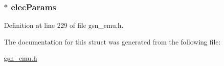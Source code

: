 \hypertarget{a00064_a76b36b28c0c66c5998cc5981154df9ed}{
\subsubsection[{elecParams}]{$\ast$ {\bf elecParams}}}
\label{a00064_a76b36b28c0c66c5998cc5981154df9ed}


Definition at line 229 of file gsn\_\-emu.h.



The documentation for this struct was generated from the following file:\begin{DoxyCompactItemize}
\item 
\hyperlink{a00489}{gsn\_\-emu.h}\end{DoxyCompactItemize}
